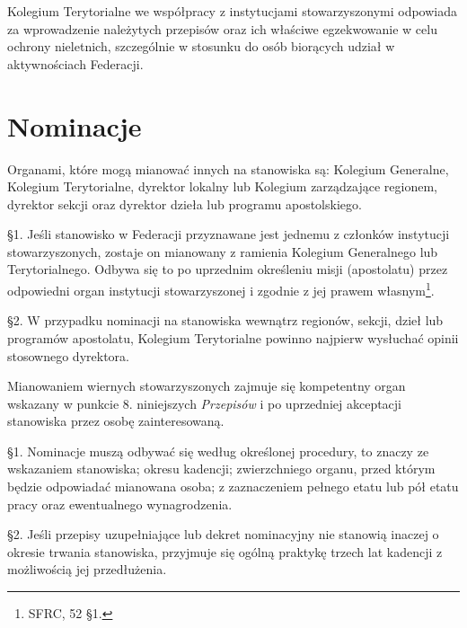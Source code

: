 \filbreak{}

 Kolegium Terytorialne we współpracy z instytucjami stowarzyszonymi odpowiada za wprowadzenie należytych przepisów oraz ich właściwe egzekwowanie w celu ochrony nieletnich, szczególnie w stosunku do osób biorących udział w aktywnościach Federacji. 

\chapter{Nominacje}


 Organami, które mogą mianować innych na stanowiska są: Kolegium Generalne, Kolegium Terytorialne, dyrektor lokalny lub Kolegium zarządzające regionem, dyrektor sekcji oraz dyrektor dzieła lub programu apostolskiego.


 \S{}1. Jeśli stanowisko w Federacji przyznawane jest jednemu z członków instytucji stowarzyszonych, zostaje on mianowany z ramienia Kolegium Generalnego lub Terytorialnego. Odbywa się to po uprzednim określeniu misji (apostolatu) przez odpowiedni organ instytucji stowarzyszonej i zgodnie z jej prawem własnym\footnote{SFRC, 52 \S{}1.}.

\S{}2. W przypadku nominacji na stanowiska wewnątrz regionów, sekcji, dzieł lub programów apostolatu, Kolegium Terytorialne powinno najpierw wysłuchać opinii stosownego dyrektora.


 Mianowaniem wiernych stowarzyszonych zajmuje się kompetentny organ wskazany w punkcie 8. niniejszych {\em Przepisów} i po uprzedniej akceptacji stanowiska przez osobę zainteresowaną.


 \S{}1. Nominacje muszą odbywać się według określonej procedury, to znaczy ze wskazaniem stanowiska; okresu kadencji; zwierzchniego organu, przed którym będzie odpowiadać mianowana osoba; z zaznaczeniem pełnego etatu lub pół etatu pracy oraz ewentualnego wynagrodzenia.

\S{}2. Jeśli przepisy uzupełniające lub dekret nominacyjny nie stanowią inaczej o okresie trwania stanowiska, przyjmuje się ogólną praktykę trzech lat kadencji z możliwością jej przedłużenia.

